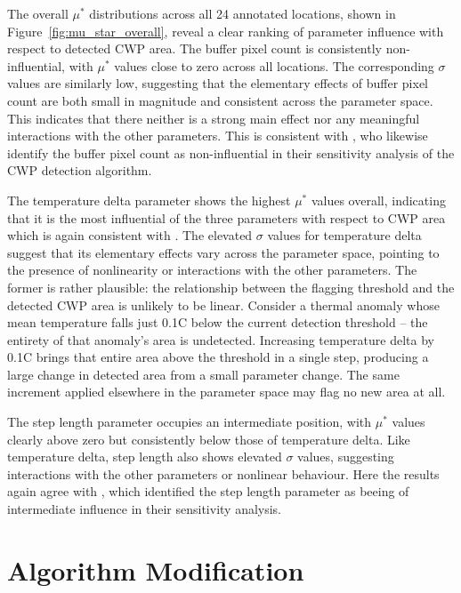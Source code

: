 The overall $\mu^*$ distributions across all 24 annotated locations, shown in 
Figure~\ref{fig:mu_star_overall}, reveal a clear ranking of parameter influence 
with respect to detected CWP area. The buffer pixel count is consistently 
non-influential, with $\mu^*$ values close to zero across all locations. The 
corresponding $\sigma$ values are similarly low, suggesting that the elementary 
effects of buffer pixel count are both small in magnitude and consistent across 
the parameter space. This indicates that there neither is a strong main effect nor any meaningful interactions with the other parameters. This is consistent with 
\citet{tonolla_thermische-kartographie_2026}, who likewise identify the buffer 
pixel count as non-influential in their sensitivity analysis of the CWP detection 
algorithm.

The temperature delta parameter shows the highest $\mu^*$ values overall, 
indicating that it is the most influential of the three parameters with respect 
to CWP area which is again consistent with 
\citet{tonolla_thermische-kartographie_2026}. The elevated $\sigma$ values for 
temperature delta suggest that its elementary effects vary across the parameter 
space, pointing to the presence of nonlinearity or interactions with the other 
parameters. The former is rather plausible: the relationship between the flagging 
threshold and the detected CWP area is unlikely to be linear. Consider a thermal 
anomaly whose mean temperature falls just 0.1\textdegree C below the current 
detection threshold -- the entirety of that anomaly's area is undetected. 
Increasing temperature delta by 0.1\textdegree C brings that entire area above 
the threshold in a single step, producing a large change in detected area from 
a small parameter change. The same increment applied elsewhere in the parameter 
space may flag no new area at all.

The step length parameter occupies an intermediate position, with $\mu^*$ values 
clearly above zero but consistently below those of temperature delta. Like 
temperature delta, step length also shows elevated $\sigma$ values, suggesting 
interactions with the other parameters or nonlinear behaviour. Here the results again agree with \cite{tonolla_thermische-kartographie_2026}, which identified the step length parameter as beeing of intermediate influence in their sensitivity analysis.

\section{Algorithm Modification}
\label{sec:rq3_discussion}

